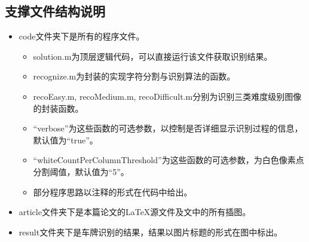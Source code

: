 \documentclass[utf8,a4paper]{ctexart}
\begin{document}
\begin{appendices}
    \section{支撑文件结构说明}
    \begin{itemize}
        \item code文件夹下是所有的程序文件。
              \begin{itemize}
                  \item solution.m为顶层逻辑代码，可以直接运行该文件获取识别结果。
                  \item recognize.m为封装的实现字符分割与识别算法的函数。
                  \item recoEasy.m, recoMedium.m, recoDifficult.m分别为识别三类难度级别图像的封装函数。
                  \item ``verbose''为这些函数的可选参数，以控制是否详细显示识别过程的信息，默认值为``true''。
                  \item ``whiteCountPerColumnThreshold''为这些函数的可选参数，为白色像素点分割阈值，默认值为``5''。
                  \item 部分程序思路以注释的形式在代码中给出。
              \end{itemize}
        \item article文件夹下是本篇论文的\LaTeX 源文件及文中的所有插图。
        \item result文件夹下是车牌识别的结果，结果以图片标题的形式在图中标出。
    \end{itemize}



\end{appendices}
\end{document}
